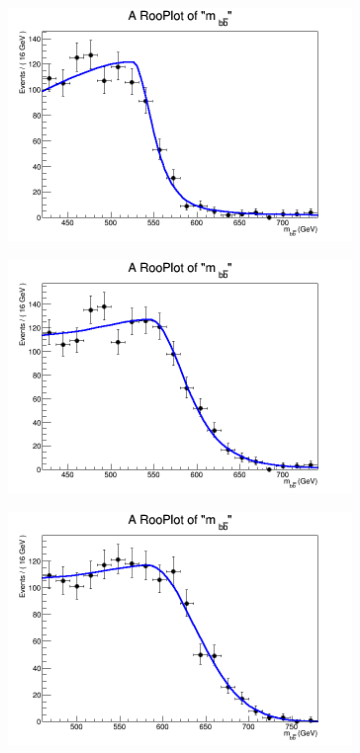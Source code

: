 \begin{figure}[phtb!]
\begin{center}
  \begin{subfigure}[$m_{A}=550$ GeV]{0.4\textwidth}\includegraphics[width=\textwidth]{FitResults/images/fitMC_bAbb550_5.png}\end{subfigure}
  \begin{subfigure}[$m_{A}=600$ GeV]{0.4\textwidth}\includegraphics[width=\textwidth]{FitResults/images/fitMC_bAbb600_5.png}\end{subfigure}
  \begin{subfigure}[$m_{A}=650$ GeV]{0.4\textwidth}\includegraphics[width=\textwidth]{FitResults/images/fitMC_bAbb650_5.png}\end{subfigure}

\end{center}
\end{figure}
